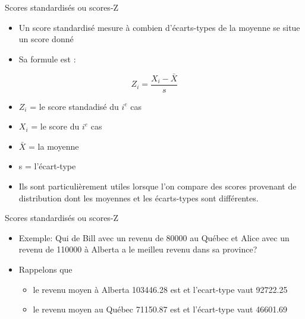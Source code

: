 \documentclass[
  ignorenonframetext,
]{beamer}
\providecommand{\tightlist}{%
  \setlength{\itemsep}{0pt}\setlength{\parskip}{0pt}}
\begin{document}
\begin{frame}{Scores standardisés ou scores-Z}
\protect\hypertarget{scores-standardisuxe9s-ou-scores-z}{}
\begin{itemize}
\tightlist
\item
  Un score standardisé mesure à combien d'écarts-types de la moyenne se
  situe un score donné
\item
  Sa formule est :
\end{itemize}

\[Z_i = \frac{X_i - \bar{X}}{s}\]

\begin{itemize}
\item
  \(Z_i\) = le score standadisé du \(i^e\) cas
\item
  \(X_i\) = le score du \(i^e\) cas
\item
  \(\bar{X}\) = la moyenne
\item
  s = l'écart-type
\item
  Ils sont particulièrement utiles lorsque l'on compare des scores
  provenant de distribution dont les moyennes et les écarts-types sont
  différentes.
\end{itemize}
\end{frame}

\begin{frame}{Scores standardisés ou scores-Z}
\protect\hypertarget{scores-standardisuxe9s-ou-scores-z-1}{}
\begin{itemize}
\item
  Exemple: Qui de Bill avec un revenu de 80000 au Québec et Alice avec
  un revenu de 110000 à Alberta a le meilleu revenu dans sa province?
\item
  Rappelons que

  \begin{itemize}
  \tightlist
  \item
    le revenu moyen à Alberta 103446.28 est et l'ecart-type vaut
    92722.25
  \item
    le revenu moyen au Québec 71150.87 est et l'écart-type vaut 46601.69
  \end{itemize}
\end{itemize}
\end{frame}
\end{document}
